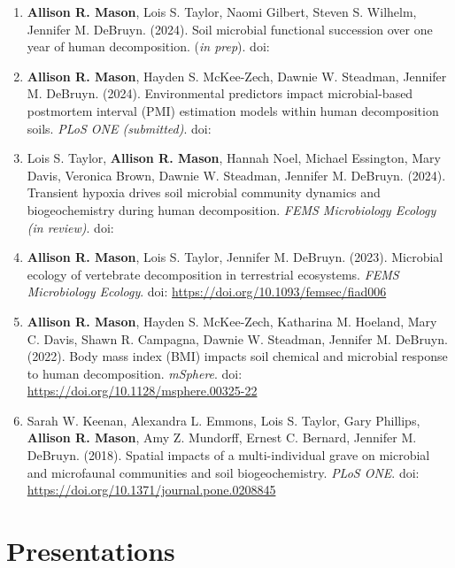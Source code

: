 \documentclass[11pt,a4paper,]{awesome-cv}
\begin{document}
\small
\begin{enumerate}
\item \textbf{Allison R. Mason}, Lois S. Taylor, Naomi Gilbert, Steven S. Wilhelm, Jennifer M. DeBruyn. (2024). Soil microbial functional succession over one year of human decomposition. (\textit{in prep}). doi: \href{https://doi.org/}{}
\item \textbf{Allison R. Mason}, Hayden S. McKee-Zech, Dawnie W. Steadman, Jennifer M. DeBruyn. (2024). Environmental predictors impact microbial-based postmortem interval (PMI) estimation models within human decomposition soils. \textit{PLoS ONE (submitted)}. doi: \href{https://doi.org/}{}
\item Lois S. Taylor, \textbf{Allison R. Mason}, Hannah Noel, Michael Essington, Mary Davis, Veronica Brown, Dawnie W. Steadman, Jennifer M. DeBruyn. (2024). Transient hypoxia drives soil microbial community dynamics and biogeochemistry during human decomposition. \textit{FEMS Microbiology Ecology (in review)}. doi: \href{https://doi.org/}{}
\item \textbf{Allison R. Mason}, Lois S. Taylor, Jennifer M. DeBruyn. (2023). Microbial ecology of vertebrate decomposition in terrestrial ecosystems. \textit{FEMS Microbiology Ecology}. doi: \href{https://doi.org/https://doi.org/10.1093/femsec/fiad006}{https://doi.org/10.1093/femsec/fiad006}
\item \textbf{Allison R. Mason}, Hayden S. McKee-Zech, Katharina M. Hoeland, Mary C. Davis, Shawn R. Campagna, Dawnie W. Steadman, Jennifer M. DeBruyn. (2022). Body mass index (BMI) impacts soil chemical and microbial response to human decomposition. \textit{mSphere}. doi: \href{https://doi.org/https://doi.org/10.1128/msphere.00325-22}{https://doi.org/10.1128/msphere.00325-22}
\item Sarah W. Keenan, Alexandra L. Emmons, Lois S. Taylor, Gary Phillips, \textbf{Allison R. Mason}, Amy Z. Mundorff, Ernest C. Bernard, Jennifer M. DeBruyn. (2018). Spatial impacts of a multi-individual grave on microbial and microfaunal communities and soil biogeochemistry. \textit{PLoS ONE}. doi: \href{https://doi.org/https://doi.org/10.1371/journal.pone.0208845}{https://doi.org/10.1371/journal.pone.0208845}
\end{enumerate}

\hypertarget{presentations}{%
\section{\texorpdfstring{\faComments Presentations}{Presentations}}\label{presentations}}
\end{document}
